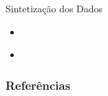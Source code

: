 \documentclass[t,14pt,mathserif]{beamer}
\begin{document}
\begin{frame}{Sintetização dos Dados}
    \begin{itemize}
      \item
    \end{itemize}
\end{frame}

\begin{frame}{}
    \begin{itemize}
      \item
    \end{itemize}
\end{frame}

\begin{frame}[allowframebreaks]
   \frametitle{Referências}
   
   
\end{frame}
\end{document}
